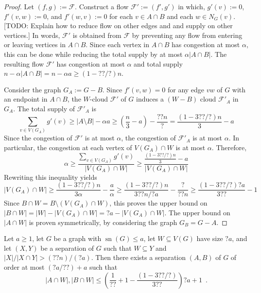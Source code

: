 \documentclass{patmorin}
\DeclareMathOperator{\sep}{sn}
\begin{document}
\begin{proof}
  Let $(f,g):=\mathcal{F}$.  Construct a flow $\mathcal{F'}:=(f',g')$ in which,  $g'(v):=0$, $f'(v,w):=0$, and $f'(w,v):=0$ for each $v\in A\cap B$ and each $w\in N_G(v)$.  [TODO: Explain how to reduce flow on other edges and and supply on other vertices.] In words, $\mathcal{F}'$ is obtained from $\mathcal{F}$ by preventing any flow from entering or leaving vertices in $A\cap B$.  Since each vertex in $A\cap B$ has congestion at most $\alpha$, this can be done while reducing the total supply by at most $\alpha|A\cap B|$.  The resulting flow $\mathcal{F}'$ has congestion at most $\alpha$ and total supply $n-\alpha|A\cap B|=n-\alpha a\ge (1-{??/?})n$.

  Consider the graph $G_A:=G-B$.  Since $f'(v,w)=0$ for any edge $vw$ of $G$ with an endpoint in $A\cap B$, the $W$-cloud $\mathcal{F}'$ of $G$ induces a $(W-B)$ cloud $\mathcal{F}'_A$ in $G_A$.  The total supply of $\mathcal{F'}_A$ is
  \[
     \sum_{v\in V(G_A)} g'(v) \ge |A\setminus B| -\alpha a \ge \left(\frac{n}{3}-a\right) - \frac{{??}n}{?} = \frac{(1-3{??}/?)n}{3} - a
  \]
  Since the congestion of $\mathcal{F}'$ is at most $\alpha$, the congestion of $\mathcal{F}'_A$ is at most $\alpha$.  In particular, the congestion at each vertex of $V(G_A)\cap W$ is at most $\alpha$.  Therefore,
  \[
     \alpha \ge \frac{\sum_{v\in V(G_A)} g'(v)}{|V(G_A)\cap W|}
     \ge \frac{\frac{(1-3{??}/?)n}{3} - a}{|V(G_A)\cap W|}
  \]
  Rewriting this inequality yields
  \[
    |V(G_A)\cap W|\ge \frac{(1-3{??}/?)n}{3\alpha}  - \frac{a}{\alpha}
    \ge \frac{(1-3{??}/{?})n}{3{??}n/{?}a} - \frac{?}{{??}n}
    \ge \frac{(1-3{??}/{?})?a}{3{??}} - 1
  \]
  Since $B\cap W=B\setminus (V(G_A)\cap W)$, this proves the upper bound on $|B\cap W|=|W|-|V(G_A)\cap W|={?}a-|V(G_A)\cap W|$. The upper bound on $|A\cap W|$ is proven symmetrically, by considering the graph $G_B=G-A$.
\end{proof}


\begin{lem}
  Let $a\ge 1$, let $G$ be a graph with $\sep(G)\le a$, let $W\subseteq V(G)$ have size ${?}a$, and let $(X,Y)$ be a separation of $G$ such that $W\subseteq Y$ and $|X|/|X\cap Y| > ({??}n)/({?}a)$.  Then there exists a separation $(A,B)$ of $G$ of order at most $(?a/??)+a$ such that
  \[
  |A\cap W|,|B\cap W|\le \left(\frac{1}{??}+1-\frac{(1-3{??}/{?})}{3{??}}\right)?a + 1 \enspace .
  \]
\end{lem}
\end{document}
